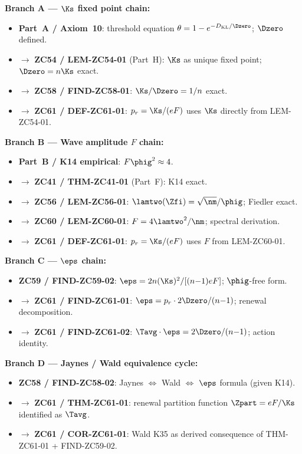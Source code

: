 \documentclass[12pt, a4paper]{article}
\begin{document}
\begin{genealogybox}[title={How ZC61's Key Objects Trace Back
  through the Z-Programme}]

\textbf{Branch A --- $\Ks$ fixed point chain:}
\begin{itemize}[leftmargin=2em, noitemsep]
  \item \textbf{Part~A / Axiom~10}: threshold equation
    $\theta = 1 - e^{-D_{\rm KL}/\Dzero}$; $\Dzero$ defined.
  \item $\to$ \textbf{ZC54 / LEM-ZC54-01} (Part~H): $\Ks$ as
    unique fixed point; $\Dzero = n\Ks$ exact.
  \item $\to$ \textbf{ZC58 / FIND-ZC58-01}: $\Ks/\Dzero = 1/n$
    exact.
  \item $\to$ \textbf{ZC61 / DEF-ZC61-01}: $p_r = \Ks/(eF)$
    uses $\Ks$ directly from LEM-ZC54-01.
\end{itemize}

\textbf{Branch B --- Wave amplitude $F$ chain:}
\begin{itemize}[leftmargin=2em, noitemsep]
  \item \textbf{Part~B / K14 empirical}: $F\phig^2 \approx 4$.
  \item $\to$ \textbf{ZC41 / THM-ZC41-01} (Part~F): K14 exact.
  \item $\to$ \textbf{ZC56 / LEM-ZC56-01}: $\lamtwo(\Zfi)
    = \sqrt{\nm}/\phig$; Fiedler exact.
  \item $\to$ \textbf{ZC60 / LEM-ZC60-01}: $F = 4\lamtwo^2/\nm$;
    spectral derivation.
  \item $\to$ \textbf{ZC61 / DEF-ZC61-01}: $p_r = \Ks/(eF)$
    uses $F$ from LEM-ZC60-01.
\end{itemize}

\textbf{Branch C --- $\eps$ chain:}
\begin{itemize}[leftmargin=2em, noitemsep]
  \item \textbf{ZC59 / FIND-ZC59-02}: $\eps = 2n(\Ks)^2/[(n{-}1)eF]$;
    $\phig$-free form.
  \item $\to$ \textbf{ZC61 / FIND-ZC61-01}:
    $\eps = p_r \cdot 2\Dzero/(n{-}1)$; renewal decomposition.
  \item $\to$ \textbf{ZC61 / FIND-ZC61-02}:
    $\Tavg\cdot\eps = 2\Dzero/(n{-}1)$; action identity.
\end{itemize}

\textbf{Branch D --- Jaynes / Wald equivalence cycle:}
\begin{itemize}[leftmargin=2em, noitemsep]
  \item \textbf{ZC58 / FIND-ZC58-02}: Jaynes $\Leftrightarrow$
    Wald $\Leftrightarrow$ $\eps$ formula (given K14).
  \item $\to$ \textbf{ZC61 / THM-ZC61-01}: renewal partition
    function $\Zpart = eF/\Ks$ identified as $\Tavg$.
  \item $\to$ \textbf{ZC61 / COR-ZC61-01}: Wald K35 as derived
    consequence of THM-ZC61-01 + FIND-ZC59-02.
\end{itemize}


\end{genealogybox}
\end{document}
